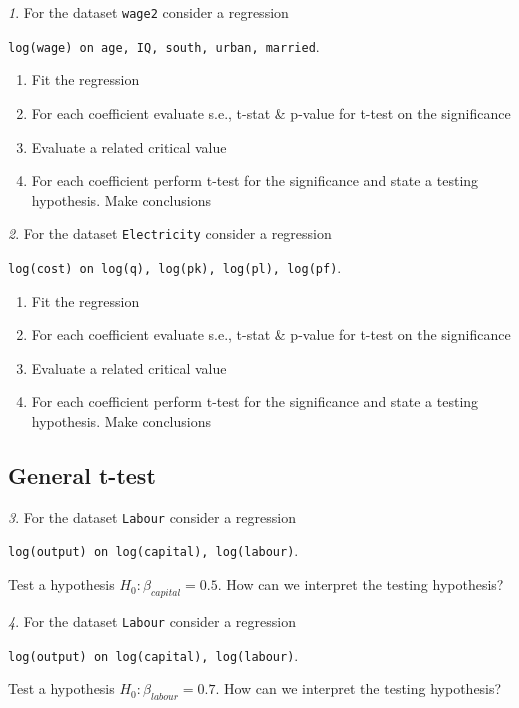 \documentclass[12pt]{article}
\theoremstyle{remark}
\newtheorem{problem}{}[section]
\begin{document}
\begin{problem}
For the dataset \texttt{wage2} consider a regression
\begin{center}
	\texttt{log(wage) on age, IQ, south, urban, married}.
\end{center}
\begin{enumerate}
	\item Fit the regression
	\item For each coefficient evaluate s.e., t-stat \& p-value for t-test on the significance 
	\item Evaluate a related critical value
	\item For each coefficient perform t-test for the significance and state a testing hypothesis.
	Make conclusions
\end{enumerate}
\end{problem}

\begin{problem}
For the dataset \texttt{Electricity} consider a regression
\begin{center}
	\texttt{log(cost) on log(q), log(pk), log(pl), log(pf)}.
\end{center}
\begin{enumerate}
	\item Fit the regression
	\item For each coefficient evaluate s.e., t-stat \& p-value for t-test on the significance 
	\item Evaluate a related critical value
	\item For each coefficient perform t-test for the significance and state a testing hypothesis.
	Make conclusions
\end{enumerate}
\end{problem}

\subsection{General t-test}

\begin{problem}
For the dataset \texttt{Labour} consider a regression
\begin{center}
	\texttt{log(output) on log(capital), log(labour)}.
\end{center}
Test a hypothesis \(H_0:\beta_{capital}=0.5\). How can we interpret 
the testing hypothesis?
\end{problem}

\begin{problem}
For the dataset \texttt{Labour} consider a regression
\begin{center}
	\texttt{log(output) on log(capital), log(labour)}.
\end{center}
Test a hypothesis \(H_0:\beta_{labour}=0.7\). How can we interpret 
the testing hypothesis?
\end{problem}
\end{document}

